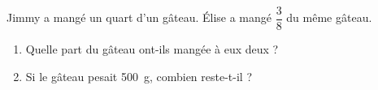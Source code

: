 
\begin{exercice}\label{exosmath-0866}
 
Jimmy a mangé un quart d'un gâteau. Élise a mangé \( \dfrac{ 3 }{ 8 }\) du même gâteau.  
\begin{enumerate}
    \item
 Quelle part du gâteau ont-ils mangée à eux deux ?
 \item
     Si le gâteau pesait \SI{500}{\gram}, combien reste-t-il ?
\end{enumerate}

\end{exercice}
